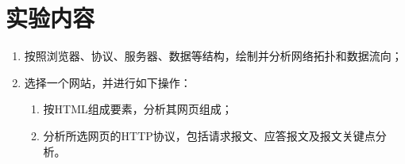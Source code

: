 \section{实验内容}
\begin{enumerate}
    \item 按照浏览器、协议、服务器、数据等结构，绘制并分析网络拓扑和数据流向；
    \item 选择一个网站，并进行如下操作：
          \begin{enumerate}
              \item 按HTML组成要素，分析其网页组成；
              \item 分析所选网页的HTTP协议，包括请求报文、应答报文及报文关键点分析。
          \end{enumerate}
\end{enumerate}